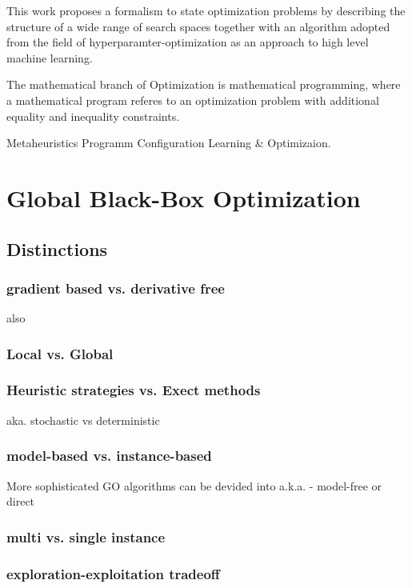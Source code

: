 \documentclass[english]{article}
\begin{document}
This work proposes a formalism to state optimization problems by describing the structure of a wide range of search spaces together with an algorithm adopted from the field of hyperparamter-optimization as an approach to high level machine learning.



The mathematical branch of Optimization is mathematical programming, where a mathematical program referes to an optimization problem with additional equality and inequality constraints.

Metaheuristics
Programm Configuration
Learning \& Optimizaion.


\section{Global Black-Box Optimization}


\subsection{Distinctions}

\subsubsection*{gradient based vs. derivative free}
also

\subsubsection*{Local vs. Global}

\subsubsection*{Heuristic strategies vs. Exect methods}
aka. stochastic vs deterministic

\subsubsection*{model-based vs. instance-based}
More sophisticated \ac{GO} algorithms can be devided into
a.k.a. - model-free or direct

\subsubsection*{multi vs. single instance}

\subsubsection*{exploration-exploitation tradeoff}
\end{document}
